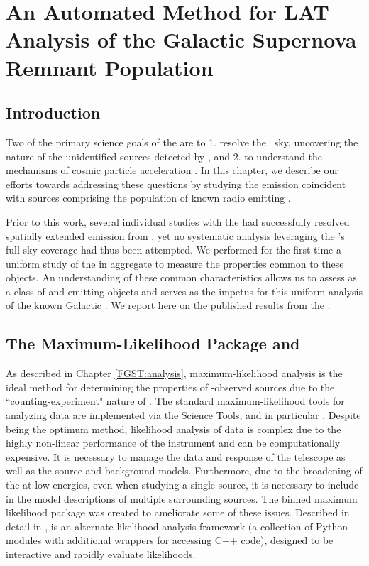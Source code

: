 \chapter{An Automated Method for LAT Analysis of the Galactic Supernova Remnant Population}
\label{chap:snrcat}


\section{Introduction}\label{snrCat:Intro}
Two of the primary science goals of the \lat{}  are to 1. resolve the \gam~sky, uncovering the nature of the unidentified sources detected by \egret{}, and 2. to understand the mechanisms of cosmic particle acceleration \citep{atwood09}. In this chapter, we describe our efforts towards addressing these questions by studying the \gam{} emission coincident with sources comprising the population of known radio emitting \snrs{}.

Prior to this work, several individual studies with the \lat{} had successfully resolved spatially extended emission from \snrs{} \citep[and references therein]{2FGL}, yet no systematic analysis leveraging the \lat{}'s full-sky coverage had thus been attempted. We performed for the first time a uniform study of the \snrs{} in aggregate to measure the properties common to these objects. An understanding of these common characteristics allows us to assess \snrs{} as a class of \gam{} and \cray{} emitting objects and serves as the impetus for this uniform analysis of the known Galactic \snrs{}. We  report here on the published results from the \snrcat{} \citep{snrCat}.
 


\section{\label{snrcat:ptlk}The \ptlike{} Maximum-Likelihood Package and \srcs{}}

As described in Chapter \ref{FGST:analysis}, maximum-likelihood analysis is the ideal method for determining the properties of \lat{}-observed sources due to the ``counting-experiment" nature of \FermiLat{}. The standard maximum-likelihood tools for analyzing \lat{} data are implemented via the \Fermi{} Science Tools, and in particular \gtlike{}.  Despite being the optimum method, likelihood analysis of \lat{} data is complex due to the highly non-linear performance of the instrument and can be computationally expensive. It is necessary to manage the data and response of the telescope as well as the source and background models. Furthermore, due to the broadening of the \psf{} at low energies, even when studying a single source, it is necessary to include in the model descriptions of multiple surrounding sources. The \ptlike{} binned maximum likelihood package was created to ameliorate some of these issues. Described in detail in \cite{Kerr10}, \ptlike{} is an alternate likelihood analysis framework (a collection of Python modules with additional wrappers for accessing C++ code), designed to be interactive and rapidly evaluate likelihoods.  

